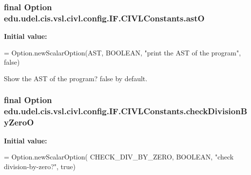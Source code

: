 \hypertarget{classedu_1_1udel_1_1cis_1_1vsl_1_1civl_1_1config_1_1IF_1_1CIVLConstants_a18c5831b00f6a2eff48de19a2a6988ff}{}
\subsubsection[{ast\+O}]{\setlength{\rightskip}{0pt plus 5cm}final Option edu.\+udel.\+cis.\+vsl.\+civl.\+config.\+I\+F.\+C\+I\+V\+L\+Constants.\+ast\+O\hspace{0.3cm}{\ttfamily [static]}}\label{classedu_1_1udel_1_1cis_1_1vsl_1_1civl_1_1config_1_1IF_1_1CIVLConstants_a18c5831b00f6a2eff48de19a2a6988ff}
{\bfseries Initial value\+:}
\begin{DoxyCode}
= Option.newScalarOption(AST, BOOLEAN,
            \textcolor{stringliteral}{"print the AST of the program"}, \textcolor{keyword}{false})
\end{DoxyCode}


Show the A\+S\+T of the program? false by default. 

\hypertarget{classedu_1_1udel_1_1cis_1_1vsl_1_1civl_1_1config_1_1IF_1_1CIVLConstants_a5c2b684020e3ff1deec767fa039bcc97}{}
\subsubsection[{check\+Division\+By\+Zero\+O}]{\setlength{\rightskip}{0pt plus 5cm}final Option edu.\+udel.\+cis.\+vsl.\+civl.\+config.\+I\+F.\+C\+I\+V\+L\+Constants.\+check\+Division\+By\+Zero\+O\hspace{0.3cm}{\ttfamily [static]}}\label{classedu_1_1udel_1_1cis_1_1vsl_1_1civl_1_1config_1_1IF_1_1CIVLConstants_a5c2b684020e3ff1deec767fa039bcc97}
{\bfseries Initial value\+:}
\begin{DoxyCode}
= Option.newScalarOption(
            CHECK\_DIV\_BY\_ZERO, BOOLEAN, \textcolor{stringliteral}{"check division-by-zero?"}, \textcolor{keyword}{true})
\end{DoxyCode}


